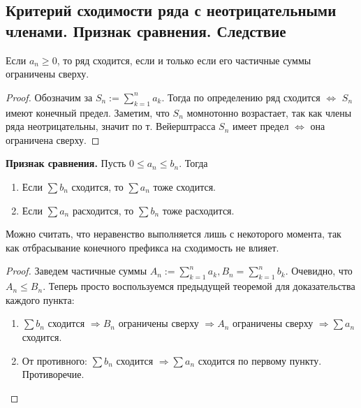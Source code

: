 \subsection{Критерий сходимости ряда с неотрицательными членами. Признак сравнения. Следствие}
\begin{theorem}
    Если $a_n \geqslant 0$, то ряд сходится, если и только если его частичные суммы ограничены сверху.
\end{theorem}
\begin{proof}
    Обозначим за $S_n := \sum\limits_{k=1}^n a_k$. 
    Тогда по определению ряд сходится $\Leftrightarrow$ $S_n$ имеют конечный предел.
    Заметим, что $S_n$ момнотонно возрастает, так как члены ряда неотрицательны, значит по т. Вейерштрасса $S_n$ имеет предел $\Leftrightarrow$ она ограничена сверху.
\end{proof}

\vspace{4mm}

\textbf{Признак сравнения.} 
Пусть $0 \leqslant a_n \leqslant b_n$. 
Тогда \begin{enumerate}
    \item Если $\sum b_n$ сходится, то $\sum a_n$ тоже сходится.
    \item Если $\sum a_n$ расходится, то $\sum b_n$ тоже расходится.
\end{enumerate}
Можно считать, что неравенство выполняется лишь с некоторого момента, так как отбрасывание конечного префикса на сходимость не влияет.
\begin{proof}
    Заведем частичные суммы $A_n := \sum\limits_{k=1}^n a_k, B_n = \sum\limits_{k=1}^n b_k$.
    Очевидно, что $A_n \leqslant B_n$.
    Теперь просто воспользуемся предыдущей теоремой для доказательства каждого пункта:
    \begin{enumerate}
        \item $\sum b_n$ сходится $\Rightarrow B_n$ ограничены сверху $\Rightarrow A_n$ ограничены сверху $\Rightarrow \sum a_n$ сходится. 
        \item От противного: $\sum b_n$ сходится $\Rightarrow \sum a_n$ сходится по первому пункту. Противоречие. 
    \end{enumerate}
\end{proof}

